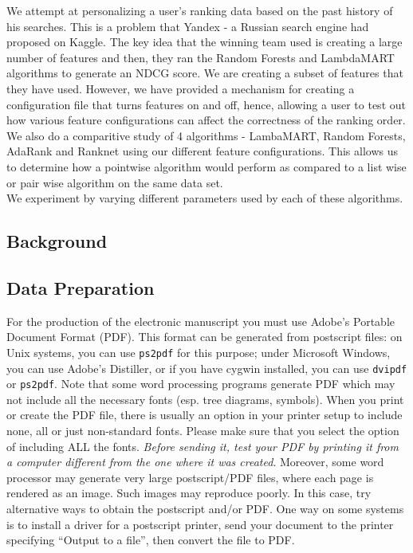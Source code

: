 \documentclass[11pt,letterpaper]{article}
\begin{document}
We attempt at personalizing a user's ranking data based on the past history of his searches. This is a problem that Yandex - a Russian search engine had proposed on Kaggle. 
The key idea that the winning team used is creating a large number of features and then, they ran the Random Forests and LambdaMART algorithms to generate an NDCG score. 
We are creating a subset of features that they have used. However, we have provided a mechanism for creating a configuration file that turns features on and off, hence, allowing a user to test out how various feature configurations can affect the correctness of the ranking order. We also do a comparitive study of 4 algorithms - LambaMART, Random Forests, AdaRank and Ranknet using our different feature configurations. This allows us to determine how a pointwise algorithm would perform as compared to a list wise or pair wise algorithm on the same data set.\\
We experiment by varying different parameters used by each of these algorithms.

\subsection{Background}




\subsection{Data Preparation}
\label{sect:pdf}

For the production of the electronic manuscript you must use Adobe's
Portable Document Format (PDF). This format can be generated from
postscript files: on Unix systems, you can use {\tt ps2pdf} for this
purpose; under Microsoft Windows, you can use Adobe's Distiller, or
if you have cygwin installed, you can use {\tt dvipdf} or
{\tt ps2pdf}.  Note 
that some word processing programs generate PDF which may not include
all the necessary fonts (esp. tree diagrams, symbols). When you print
or create the PDF file, there is usually an option in your printer
setup to include none, all or just non-standard fonts.  Please make
sure that you select the option of including ALL the fonts.  {\em
  Before sending it, test your {\/\em PDF} by printing it from a
  computer different from the one where it was created}. Moreover,
some word processor may generate very large postscript/PDF files,
where each page is rendered as an image. Such images may reproduce
poorly.  In this case, try alternative ways to obtain the postscript
and/or PDF.  One way on some systems is to install a driver for a
postscript printer, send your document to the printer specifying
``Output to a file'', then convert the file to PDF.
\end{document}
